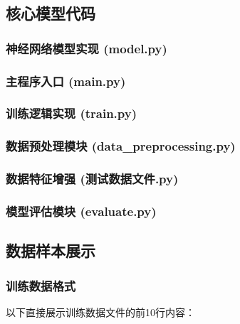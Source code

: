 \documentclass{article}
\begin{document}
\subsection{核心模型代码}
\subsubsection{神经网络模型实现 (model.py)}


\subsubsection{主程序入口 (main.py)}


\subsubsection{训练逻辑实现 (train.py)}


\subsubsection{数据预处理模块 (data\_preprocessing.py)}


\subsubsection{数据特征增强 (测试数据文件.py)}


\subsubsection{模型评估模块 (evaluate.py)}


\subsection{数据样本展示}
\subsubsection{训练数据格式}
以下直接展示训练数据文件的前10行内容：
\end{document}

